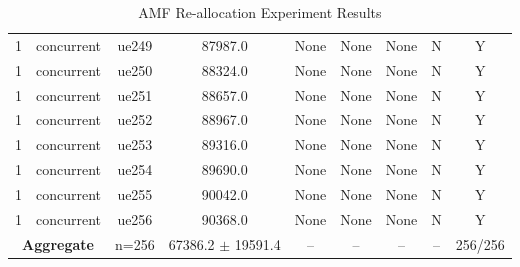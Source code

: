 \begin{table}[ht]
\begin{tabular}{|c|c|c|c|c|c|c|c|c|}
1 & concurrent & ue249 & 87987.0 & None & None & None & N & Y \\
1 & concurrent & ue250 & 88324.0 & None & None & None & N & Y \\
1 & concurrent & ue251 & 88657.0 & None & None & None & N & Y \\
1 & concurrent & ue252 & 88967.0 & None & None & None & N & Y \\
1 & concurrent & ue253 & 89316.0 & None & None & None & N & Y \\
1 & concurrent & ue254 & 89690.0 & None & None & None & N & Y \\
1 & concurrent & ue255 & 90042.0 & None & None & None & N & Y \\
1 & concurrent & ue256 & 90368.0 & None & None & None & N & Y \\
\multicolumn{2}{|c|}{\textbf{Aggregate}} & n=256 & 67386.2 $\pm$ 19591.4 & -- & -- & -- & -- & 256/256 \\
\hline
\end{tabular}
\caption{AMF Re-allocation Experiment Results}
\label{tab:amf_realloc}
\end{table}
